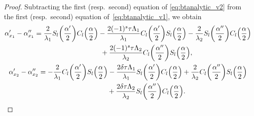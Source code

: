 \documentclass[10pt,a4paper]{amsart}
\numberwithin{equation}{section}
\begin{document}
\begin{proof}
Subtracting the first (resp.\ second) equation of \eqref{eq:btanalytic_v2} from the first
(resp.\ second) equation of~\eqref{eq:btanalytic_v1}, we obtain
\begin{gather}
\alpha'_{x_1}-\alpha''_{x_1}= \frac{2}{\lambda_1}S_{l}\biggl(\frac{\alpha'}{2}\biggr)C_{l}\Bigl(\frac{\alpha}{2}\Bigr)-\frac{2(-1)^s\tau\Lambda_1}{\lambda_1} C_{l}\biggl(\frac{\alpha'}{2}\biggr)S_{l}\Bigl(\frac{\alpha}{2}\Bigr) -\frac{2}{\lambda_2}S_{l}\biggl(\frac{\alpha''}{2}\biggr)C_{l}\Bigl(\frac{\alpha}{2}\Bigr)
\nonumber\\ \hphantom{\alpha'_{x_1}-\alpha''_{x_1}=}{}
+\frac{2(-1)^s\tau\Lambda_2}{\lambda_2}C_{l}
\biggl(\frac{\alpha''}{2}\biggr)S_{l}\Bigl(\frac{\alpha}{2}\Bigr),\label{eq:primv1-v2}
\\
\alpha'_{x_2}-\alpha''_{x_2}=
-\frac{2}{\lambda_1}C_{l}\biggl(\frac{\alpha'}{2}\biggr)S_{l}\Bigl(\frac{\alpha}{2}\Bigr)-\frac{2\delta\tau\Lambda_1}{\lambda_1} S_{l}\biggl(\frac{\alpha'}{2}\biggr)C_{l}\Bigl(\frac{\alpha}{2}\Bigr) +\frac{2}{\lambda_2}C_{l}\biggl(\frac{\alpha''}
{2 }\biggr)S_{l}\Bigl(\frac{\alpha}{2}\Bigr)
\nonumber\\ \hphantom{\alpha'_{x_2}-\alpha''_{x_2}=}{}
+\frac{2\delta\tau\Lambda_2}{\lambda_2} S_{l}\biggl(\frac{\alpha''}{2}\biggr)C_{l}\Bigl(\frac{\alpha}{2}\Bigr).\label{eq:segv1-v2}
\end{gather}


\end{proof}
\end{document}
